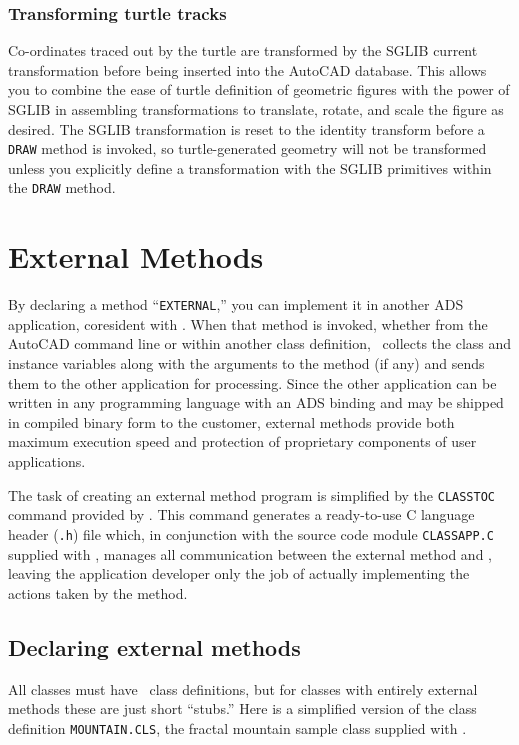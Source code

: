 \documentclass{article}
\begin{document}
\subsubsection{Transforming turtle tracks}

Co-ordinates traced out by the turtle are transformed by the SGLIB
current transformation before being inserted into the AutoCAD database.
This allows you to combine the ease of turtle definition of geometric
figures with the power of SGLIB in assembling transformations to
translate, rotate, and scale the figure as desired.  The SGLIB
transformation is reset to the identity transform before a {\tt DRAW}
method is invoked, so turtle-generated geometry will not be
transformed unless you explicitly define a transformation with the
SGLIB primitives within the {\tt DRAW} method.

\section{External Methods}

By declaring a method ``{\tt EXTERNAL},'' you can implement it in
another ADS application, coresident with \cw .  When that
method is invoked, whether from the AutoCAD command line or within
another class definition, \cw\ collects the class and instance
variables along with the arguments to the method (if any) and sends them to
the other application for processing.  Since the other application can
be written in any programming language with an ADS binding and may be
shipped in compiled binary form to the customer, external methods provide both
maximum execution speed and protection of proprietary components of
user applications.

The task of creating an external method program is simplified by the
{\tt CLASSTOC} command provided by \cw .  This command generates a
ready-to-use C language header ({\tt .h}) file which, in conjunction
with the source code module {\tt CLASSAPP.C} supplied with \cw ,
manages all communication between the external method and \cw ,
leaving the application developer only the job of actually
implementing the actions taken by the method.

\subsection{Declaring external methods}

All classes must have \cw\ class definitions, but for classes with
entirely external methods these are just short ``stubs.''  Here is a
simplified version of the
class definition {\tt MOUNTAIN.CLS}, the fractal mountain sample class
supplied with \cw .
\end{document}
